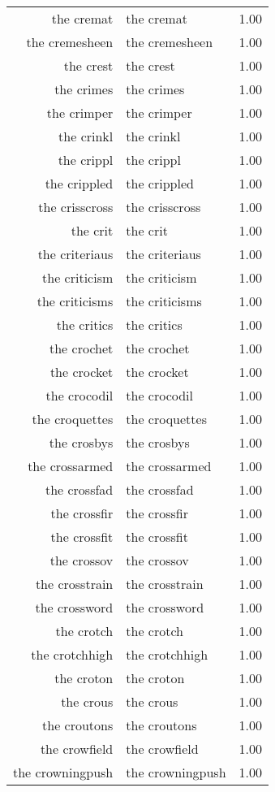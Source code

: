 \begin{table}[ht]
\begin{tabular}{rlr}
  the cremat & the cremat & 1.00 \\ 
  the cremesheen & the cremesheen & 1.00 \\ 
  the crest & the crest & 1.00 \\ 
  the crimes & the crimes & 1.00 \\ 
  the crimper & the crimper & 1.00 \\ 
  the crinkl & the crinkl & 1.00 \\ 
  the crippl & the crippl & 1.00 \\ 
  the crippled & the crippled & 1.00 \\ 
  the crisscross & the crisscross & 1.00 \\ 
  the crit & the crit & 1.00 \\ 
  the criteriaus & the criteriaus & 1.00 \\ 
  the criticism & the criticism & 1.00 \\ 
  the criticisms & the criticisms & 1.00 \\ 
  the critics & the critics & 1.00 \\ 
  the crochet & the crochet & 1.00 \\ 
  the crocket & the crocket & 1.00 \\ 
  the crocodil & the crocodil & 1.00 \\ 
  the croquettes & the croquettes & 1.00 \\ 
  the crosbys & the crosbys & 1.00 \\ 
  the crossarmed & the crossarmed & 1.00 \\ 
  the crossfad & the crossfad & 1.00 \\ 
  the crossfir & the crossfir & 1.00 \\ 
  the crossfit & the crossfit & 1.00 \\ 
  the crossov & the crossov & 1.00 \\ 
  the crosstrain & the crosstrain & 1.00 \\ 
  the crossword & the crossword & 1.00 \\ 
  the crotch & the crotch & 1.00 \\ 
  the crotchhigh & the crotchhigh & 1.00 \\ 
  the croton & the croton & 1.00 \\ 
  the crous & the crous & 1.00 \\ 
  the croutons & the croutons & 1.00 \\ 
  the crowfield & the crowfield & 1.00 \\ 
  the crowningpush & the crowningpush & 1.00 \\ 

\end{tabular}
\end{table}
